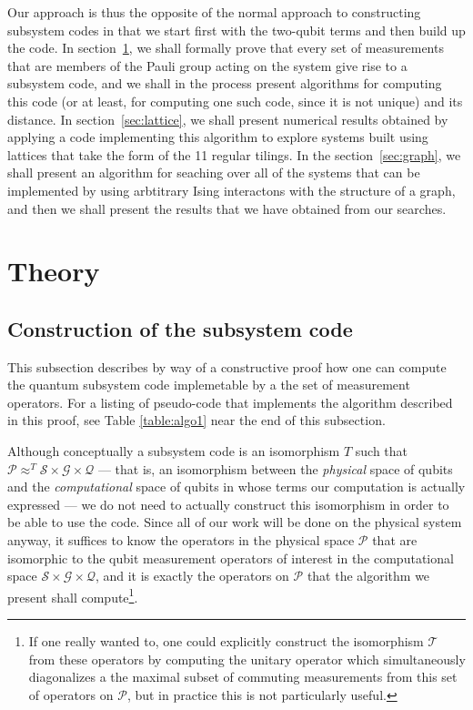 \documentclass[twocolumn,showpacs,preprintnumbers,amsmath,amssymb,nofootinbib,pra,floatfix]{revtex4-1}
\newenvironment{remark}[1][Remark]{\begin{trivlist}
\item[\hskip \labelsep {\bfseries #1}]}{\end{trivlist}}
\begin{document}
Our approach is thus the opposite of the normal approach to constructing subsystem codes in that we start first with the two-qubit terms and then build up the code.  In section~\ref{sec:algorithm}, we shall formally prove that every set of measurements that are members of the Pauli group acting on the system give rise to a subsystem code, and we shall in the process present algorithms for computing this code (or at least, for computing one such code, since it is not unique) and its distance.  In section~\ref{sec:lattice}, we shall present numerical results obtained by applying a code implementing this algorithm to explore systems built using lattices that take the form of the 11 regular tilings.  In the section~\ref{sec:graph}, we shall present an algorithm for seaching over all of the systems that can be implemented by using arbtitrary Ising interactons
with the structure of a graph, and then we shall present the results that we have obtained from our searches.
\section{Theory} \label{sec:algorithm}

\subsection{Construction of the subsystem code}

\begin{remark}
This subsection describes by way of a constructive proof how one can compute the quantum subsystem code implemetable by a the set of measurement operators.  For a listing of pseudo-code that implements the algorithm described in this proof, see Table \ref{table:algo1} near the end of this subsection.
\end{remark}
Although conceptually a subsystem code is an isomorphism $T$ such that  $\mathscr{P}\approx^T \mathscr{S}\times\mathscr{G}\times\mathscr{Q}$ --- that is, an isomorphism between the \emph{physical} space of qubits and the \emph{computational} space of qubits in whose terms our computation is actually expressed --- we do not need to actually construct this isomorphism in order to be able to use the code.  Since all of our work will be done on the physical system anyway, it suffices to know the operators in the physical space $\mathscr{P}$ that are isomorphic to the qubit measurement operators of interest in the computational space $\mathscr{S}\times\mathscr{G}\times\mathscr{Q}$, and it is exactly the operators on $\mathscr{P}$ that the algorithm we present shall compute\footnote{If one really wanted to, one could explicitly construct the isomorphism $\mathscr{T}$ from these operators by computing the unitary operator which simultaneously diagonalizes a the maximal subset of commuting measurements from this set of operators on $\mathscr{P}$, but in practice this is not particularly useful.}.
\end{document}

